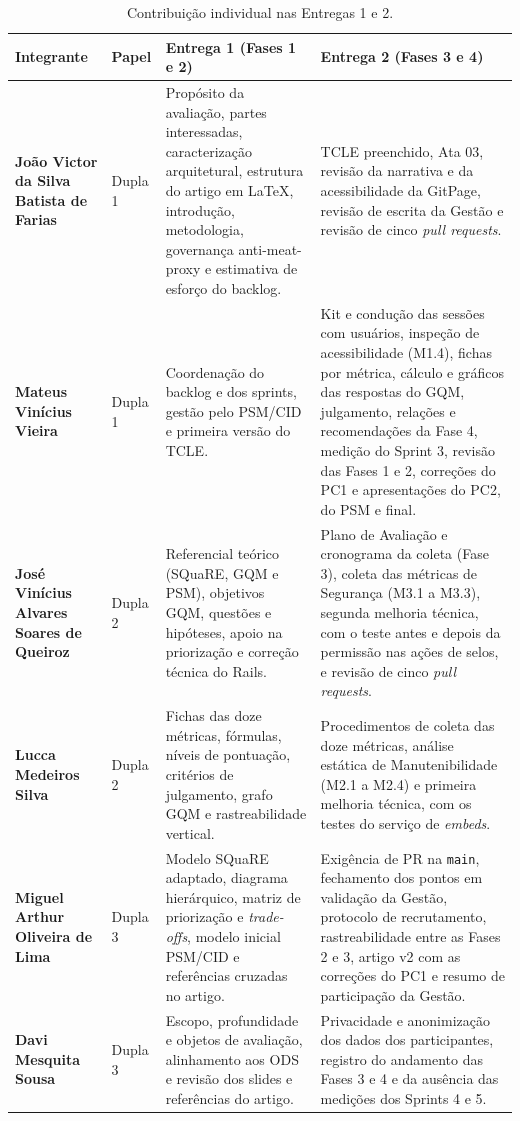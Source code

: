 \documentclass[journal]{IEEEtran}
\begin{document}
\begin{table}[!t]
\centering
\caption{Contribuição individual nas Entregas 1 e 2.}
\label{tab:contribuicao_equipe}
\footnotesize
\setlength{\tabcolsep}{3pt}
\begin{tabular}{@{}>{\raggedright\arraybackslash}p{} >{\raggedright\arraybackslash}p{} >{\raggedright\arraybackslash}p{} >{\raggedright\arraybackslash}p{}@{}}
\toprule
\textbf{Integrante} & \textbf{Papel} & \textbf{Entrega 1 (Fases 1 e 2)} & \textbf{Entrega 2 (Fases 3 e 4)} \\
\midrule
\textbf{João Victor da Silva Batista de Farias} & Dupla 1 & Propósito da avaliação, partes interessadas, caracterização arquitetural, estrutura do artigo em LaTeX, introdução, metodologia, governança anti-meat-proxy e estimativa de esforço do backlog. & TCLE preenchido, Ata 03, revisão da narrativa e da acessibilidade da GitPage, revisão de escrita da Gestão e revisão de cinco \textit{pull requests}. \\
\midrule
\textbf{Mateus Vinícius Vieira} & Dupla 1 & Coordenação do backlog e dos sprints, gestão pelo PSM/CID e primeira versão do TCLE. & Kit e condução das sessões com usuários, inspeção de acessibilidade (M1.4), fichas por métrica, cálculo e gráficos das respostas do GQM, julgamento, relações e recomendações da Fase 4, medição do Sprint 3, revisão das Fases 1 e 2, correções do PC1 e apresentações do PC2, do PSM e final. \\
\midrule
\textbf{José Vinícius Alvares Soares de Queiroz} & Dupla 2 & Referencial teórico (SQuaRE, GQM e PSM), objetivos GQM, questões e hipóteses, apoio na priorização e correção técnica do Rails. & Plano de Avaliação e cronograma da coleta (Fase 3), coleta das métricas de Segurança (M3.1 a M3.3), segunda melhoria técnica, com o teste antes e depois da permissão nas ações de selos, e revisão de cinco \textit{pull requests}. \\
\midrule
\textbf{Lucca Medeiros Silva} & Dupla 2 & Fichas das doze métricas, fórmulas, níveis de pontuação, critérios de julgamento, grafo GQM e rastreabilidade vertical. & Procedimentos de coleta das doze métricas, análise estática de Manutenibilidade (M2.1 a M2.4) e primeira melhoria técnica, com os testes do serviço de \textit{embeds}. \\
\midrule
\textbf{Miguel Arthur Oliveira de Lima} & Dupla 3 & Modelo SQuaRE adaptado, diagrama hierárquico, matriz de priorização e \textit{trade-offs}, modelo inicial PSM/CID e referências cruzadas no artigo. & Exigência de PR na \texttt{main}, fechamento dos pontos em validação da Gestão, protocolo de recrutamento, rastreabilidade entre as Fases 2 e 3, artigo v2 com as correções do PC1 e resumo de participação da Gestão. \\
\midrule
\textbf{Davi Mesquita Sousa} & Dupla 3 & Escopo, profundidade e objetos de avaliação, alinhamento aos ODS e revisão dos slides e referências do artigo. & Privacidade e anonimização dos dados dos participantes, registro do andamento das Fases 3 e 4 e da ausência das medições dos Sprints 4 e 5. \\
\bottomrule
\end{tabular}


\end{table}
\end{document}

